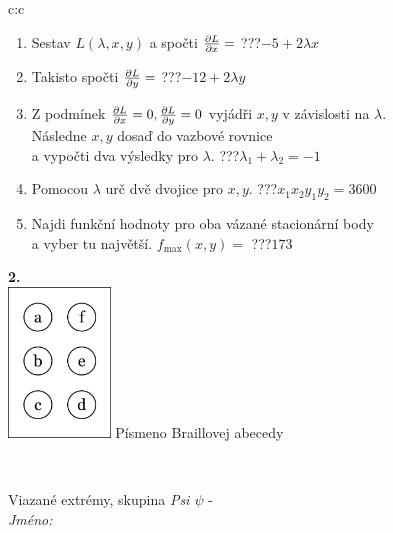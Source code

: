 \documentclass[10pt]{report}
\begin{document}
\begin{tabular}{c:c}
\begin{minipage}[c][104.5mm][t]{0.5\linewidth}
\begin{center}
\begin{minipage}{0.79\linewidth}
\begin{center}
\begin{varwidth}{\linewidth}
\begin{enumerate}
\item Sestav $L(\lambda,x,y)$ a spočti $\pdv{L}{x}=$\quad \dotfill\; ???\;\dotfill \quad $-5+2\lambda x$
\item Takisto spočti $\pdv{L}{y}=$\quad \dotfill\; ???\;\dotfill \quad $-12+2\lambda y$
\item Z podmínek $\pdv{L}{x}=0 , \pdv{L}{y}=0$ vyjádři $x,y$ v závislosti na $\lambda$.\\ \phantom{xxxxxx}Následne $x,y$ dosaď do vazbové rovnice\\ \phantom{xxxxxx}a vypočti dva výsledky pro $\lambda$.\quad \dotfill\; ???\;\dotfill \quad $\lambda_1+\lambda_2=-1$
\item Pomocou $\lambda$ urč dvě dvojice pro $x,y$.\quad \dotfill\; ???\;\dotfill \quad $x_1 x_2 y_1 y_2=3600$
\item Najdi funkční hodnoty pro oba vázané stacionární body\\ \phantom{xxxxxx}a vyber tu najvětší. $f_{\text{max}}(x,y)=$\quad \dotfill\; ???\;\dotfill \quad $173$
\end{enumerate}
\end{varwidth}
\end{center}
\end{minipage}
\begin{minipage}{0.20\linewidth}
\begin{center}
{\Huge\bfseries 2.} \\[2mm]
\includegraphics[height=40mm]{../images/braille.png}
{\small Písmeno Braillovej abecedy}
\end{center}
\end{minipage}
\end{center}
\end{minipage}
\\ \hdashline
\begin{minipage}[c][104.5mm][t]{0.5\linewidth}
\begin{center}
\vspace{7mm}
{\huge Viazané extrémy, skupina \textit{Psi $\psi$} -}\\[5mm]
\textit{Jméno:}\phantom{xxxxxxxxxxxxxxxxxxxxxxxxxxxxxxxxxxxxxxxxxxxxxxxxxxxxxxxxxxxxxxxxx}\\[5mm]

\end{center}
\end{minipage}
\end{tabular}
\end{document}
